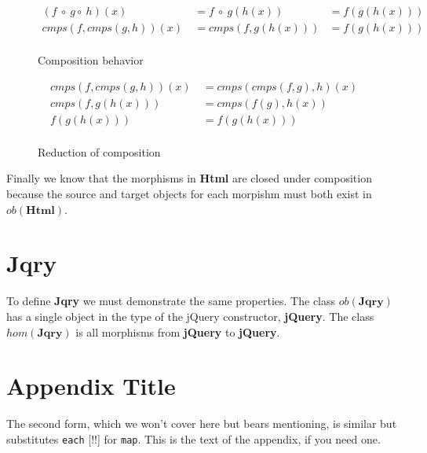 \documentclass[preprint]{sigplanconf}
\begin{document}
\begin{figure}[h!]
\begin{displaymath}
\begin{align*}
(f\ \circ\ g \circ\ h)(x)\ &= f\ \circ\ g(h(x)) &= f(g(h(x)))\\
cmps(f,cmps(g,h))(x)\ &= cmps(f, g(h(x))) &= f(g(h(x)))\\
\end{align*}
\end{displaymath}
\nocaptionrule \caption{Composition behavior}
\end{figure}

\begin{figure}[h!]
\begin{displaymath}
\begin{align*}
cmps(f,cmps(g,h))(x)\ &= cmps(cmps(f,g),h)(x) \\
cmps(f,g(h(x)))\ &= cmps(f(g),h(x)) \\
f(g(h(x)))\ &= f(g(h(x)))\\
\end{align*}
\end{displaymath}
\nocaptionrule \caption{Reduction of composition}
\end{figure}

Finally we know that the morphisms in \textbf{Html} are closed under composition because the source and target objects for each morpishm must both exist in \begin{math}ob(\mathbf{Html})\end{math}.

\section{Jqry}

To define \textbf{Jqry} we must demonstrate the same properties. The class \begin{math}ob(\mathbf{Jqry})\end{math} has a single object in the type of the jQuery constructor, \textbf{jQuery}. The class \begin{math}hom(\mathbf{Jqry})\end{math} is all morphisms from \textbf{jQuery} to \textbf{jQuery}.

\appendix
\section{Appendix Title}

The second form, which we won't cover here but bears mentioning, is similar but substitutes \verb|each| [!!] for \verb|map|.
This is the text of the appendix, if you need one.
\end{document}
